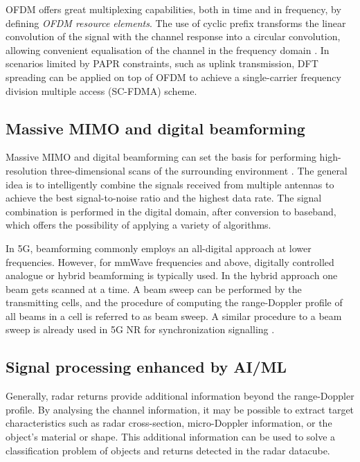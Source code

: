 	OFDM offers great multiplexing capabilities, both in time and in frequency, by defining  \textit{OFDM resource elements}. The use of cyclic prefix transforms the linear convolution of the signal with the channel response into a circular convolution, allowing convenient equalisation of the channel in the frequency domain \cite{Wild_Grudnitsky_Mandelli_Henninger_Guan_Schaich_2023}. In scenarios limited by PAPR constraints, such as uplink transmission, DFT spreading can  be applied on top of OFDM to achieve a single-carrier frequency division multiple access (SC-FDMA) scheme.

	
	\subsection{Massive MIMO and digital beamforming}
	
	Massive MIMO and digital beamforming can set the basis for performing high-resolution three-dimensional scans of the surrounding environment \cite{MIMO-next-gen}.
	The general idea is to intelligently combine the signals received from multiple antennas to achieve the best signal-to-noise ratio and the highest data rate. The signal combination is performed in the digital domain, after conversion to baseband, which offers the possibility of applying a variety of algorithms.
	
	In 5G, beamforming commonly employs an all-digital approach at lower frequencies. However, for mmWave frequencies and above, digitally controlled analogue or hybrid beamforming is typically used. In the hybrid approach one beam gets scanned at a time. A beam sweep can be performed by the transmitting cells, and the procedure of computing the range-Doppler profile of all beams in a cell is referred to as beam sweep. A similar procedure to a beam sweep is already used in 5G NR for synchronization signalling \cite{Wild_Braun_Viswanathan_2021}.
	
	\subsection{Signal processing enhanced by AI/ML}
	Generally, radar returns provide additional information beyond the range-Doppler profile. By analysing the channel information, it may be possible to extract target characteristics such as radar cross-section, micro-Doppler information, or the object's material or shape.
	This additional information can be used to solve a classification problem of objects and returns detected in the radar datacube.


